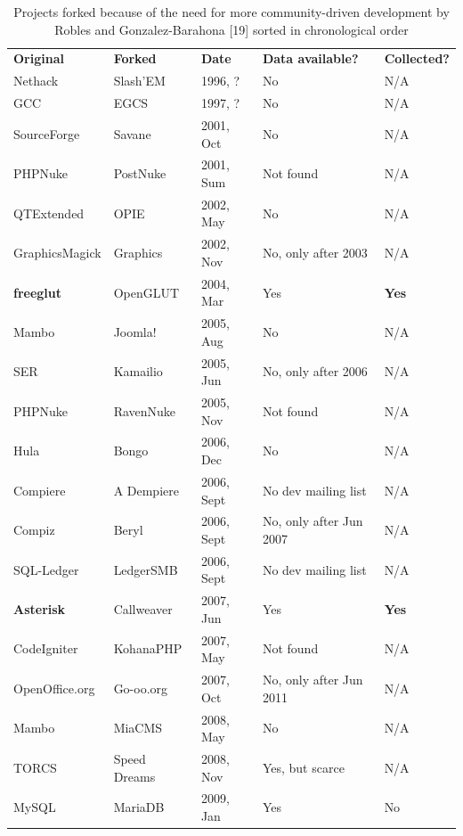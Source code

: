 \documentclass[ifip]{svmult}
\begin{document}
\begin{table}
\centering
\caption{Projects forked because of the need for more community-driven development by Robles and Gonzalez-Barahona [19] sorted in chronological order}
\label{tab:4}
\begin{tabular}{p{0.95in} p{0.85in} p{0.7in} p{1.4in} p{0.4in}}\hline\noalign{\smallskip}
\textbf{Original} & \textbf{Forked} & \textbf{Date} & \textbf{Data available?} & \textbf{Collected?}\\
\noalign{\smallskip}\hline\noalign{\smallskip}
Nethack & Slash'EM & 1996, ? & No & N/A \\ \hline
GCC & EGCS & 1997, ? & No & N/A \\ \hline
SourceForge & Savane & 2001, Oct & No & N/A \\ \hline
PHPNuke & PostNuke & 2001, Sum & Not found & N/A \\ \hline
QTExtended & OPIE & 2002, May & No & N/A \\ \hline
GraphicsMagick & Graphics & 2002, Nov  & No, only after 2003 & N/A \\ \hline
\textbf{freeglut} & OpenGLUT & 2004, Mar & Yes & \textbf{Yes} \\ \hline
Mambo & Joomla! & 2005, Aug & No & N/A \\ \hline
SER & Kamailio & 2005, Jun & No, only after 2006 & N/A \\ \hline
PHPNuke & RavenNuke & 2005, Nov & Not found & N/A \\ \hline
Hula & Bongo & 2006, Dec & No & N/A \\ \hline
Compiere & A Dempiere & 2006, Sept & No dev mailing list & N/A \\ \hline
Compiz & Beryl & 2006, Sept & No, only after Jun 2007 & N/A \\ \hline
SQL-Ledger & LedgerSMB & 2006, Sept & No dev mailing list & N/A \\ \hline
\textbf{Asterisk} & Callweaver & 2007, Jun & Yes & \textbf{Yes} \\ \hline
CodeIgniter & KohanaPHP & 2007, May & Not found & N/A \\ \hline
OpenOffice.org & Go-oo.org & 2007, Oct & No, only after Jun 2011 & N/A \\ \hline
Mambo & MiaCMS & 2008, May & No & N/A \\ \hline
TORCS & Speed Dreams & 2008, Nov & Yes, but scarce & N/A \\ \hline
MySQL & MariaDB & 2009, Jan & Yes & No\\ \hline

\end{tabular}
\end{table}
\end{document}

